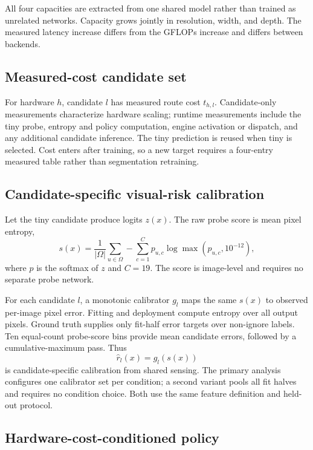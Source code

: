 \documentclass[a4paper,review,12pt]{elsarticle}
\begin{document}
All four capacities are extracted from one shared model rather than trained as unrelated networks. Capacity grows jointly in resolution, width, and depth. The measured latency increase differs from the GFLOPs increase and differs between backends.

\subsection{Measured-cost candidate set}
\label{sec:measured-cost}

For hardware $h$, candidate $l$ has measured route cost $t_{h,l}$. Candidate-only measurements characterize hardware scaling; runtime measurements include the tiny probe, entropy and policy computation, engine activation or dispatch, and any additional candidate inference. The tiny prediction is reused when tiny is selected. Cost enters after training, so a new target requires a four-entry measured table rather than segmentation retraining.

\subsection{Candidate-specific visual-risk calibration}
\label{sec:calibration}

Let the tiny candidate produce logits $z(x)$. The raw probe score is mean pixel entropy,
\begin{equation}
s(x)=\frac{1}{|\Omega|}\sum_{u\in\Omega}-\sum_{c=1}^{C}p_{u,c}\log\max(p_{u,c},10^{-12}),
\label{eq:entropy}
\end{equation}
where $p$ is the softmax of $z$ and $C=19$. The score is image-level and requires no separate probe network.

For each candidate $l$, a monotonic calibrator $g_l$ maps the same $s(x)$ to observed per-image pixel error. Fitting and deployment compute entropy over all output pixels. Ground truth supplies only fit-half error targets over non-ignore labels. Ten equal-count probe-score bins provide mean candidate errors, followed by a cumulative-maximum pass. Thus
\begin{equation}
\widehat{r}_l(x)=g_l(s(x))
\label{eq:risk}
\end{equation}
is candidate-specific calibration from shared sensing. The primary analysis configures one calibrator set per condition; a second variant pools all fit halves and requires no condition choice. Both use the same feature definition and held-out protocol.

\subsection{Hardware-cost-conditioned policy}
\label{sec:policy}
\end{document}
